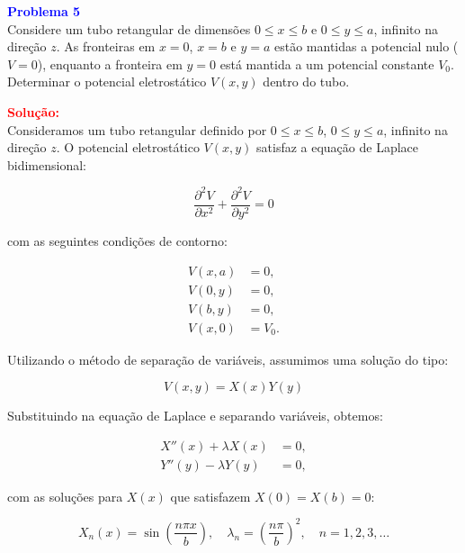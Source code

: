 \documentclass[a4paper,12pt]{article}
\begin{document}
\begin{flushleft}
\textbf{\textcolor{blue}{\Large Problema 5}}\\

Considere um tubo retangular de dimensões \( 0 \leq x \leq b \) e \( 0 \leq y \leq a \), infinito na direção \( z \).  
As fronteiras em \( x = 0 \), \( x = b \) e \( y = a \) estão mantidas a potencial nulo (\( V = 0 \)), enquanto  
a fronteira em \( y = 0 \) está mantida a um potencial constante \( V_0 \).  
Determinar o potencial eletrostático \( V(x, y) \) dentro do tubo.

\textcolor{red}{\textbf{Solução:}}\\


Consideramos um tubo retangular definido por \( 0 \leq x \leq b \), \( 0 \leq y \leq a \), infinito na direção \( z \). O potencial eletrostático \( V(x, y) \) satisfaz a equação de Laplace bidimensional:

\begin{equation}
\frac{\partial^2 V}{\partial x^2} + \frac{\partial^2 V}{\partial y^2} = 0
\end{equation}

com as seguintes condições de contorno:

\begin{align*}
V(x, a) &= 0, \\
V(0, y) &= 0, \\
V(b, y) &= 0, \\
V(x, 0) &= V_0.
\end{align*}

Utilizando o método de separação de variáveis, assumimos uma solução do tipo:

\begin{equation}
V(x, y) = X(x)Y(y)
\end{equation}

Substituindo na equação de Laplace e separando variáveis, obtemos:

\begin{align*}
X''(x) + \lambda X(x) &= 0, \\
Y''(y) - \lambda Y(y) &= 0,
\end{align*}

com as soluções para \( X(x) \) que satisfazem \( X(0) = X(b) = 0 \):

\begin{equation}
X_n(x) = \sin\left( \frac{n\pi x}{b} \right), \quad \lambda_n = \left( \frac{n\pi}{b} \right)^2, \quad n = 1, 2, 3, \ldots
\end{equation}


\end{flushleft}
\end{document}

